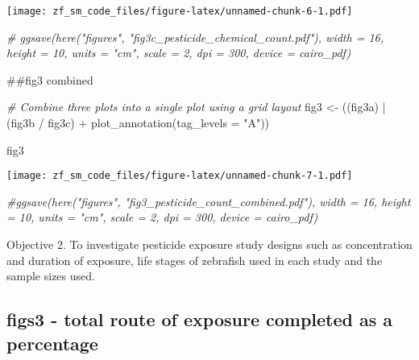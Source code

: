 \documentclass[
]{article}
\newenvironment{Shaded}{\begin{snugshade}}{\end{snugshade}}
\newcommand{\AttributeTok}[1]{\textcolor[rgb]{0.77,0.63,0.00}{#1}}
\newcommand{\CommentTok}[1]{\textcolor[rgb]{0.56,0.35,0.01}{\textit{#1}}}
\newcommand{\FunctionTok}[1]{\textcolor[rgb]{0.00,0.00,0.00}{#1}}
\newcommand{\NormalTok}[1]{#1}
\newcommand{\OtherTok}[1]{\textcolor[rgb]{0.56,0.35,0.01}{#1}}
\newcommand{\SpecialCharTok}[1]{\textcolor[rgb]{0.00,0.00,0.00}{#1}}
\newcommand{\StringTok}[1]{\textcolor[rgb]{0.31,0.60,0.02}{#1}}
\begin{document}
\texttt{[image: zf\_sm\_code\_files/figure-latex/unnamed-chunk-6-1.pdf]}

\begin{Shaded}
\begin{Highlighting}[]
\CommentTok{\# ggsave(here("figures", "fig3c\_pesticide\_chemical\_count.pdf"), width = 16, height = 10, units = "cm", scale = 2, dpi = 300, device = cairo\_pdf)}
\end{Highlighting}
\end{Shaded}

\#\#fig3 combined

\begin{Shaded}
\begin{Highlighting}[]
\CommentTok{\# Combine three plots into a single plot using a grid layout}
\NormalTok{fig3 }\OtherTok{\textless{}{-}}\NormalTok{ ((fig3a) }\SpecialCharTok{|}\NormalTok{ (fig3b }\SpecialCharTok{/}\NormalTok{ fig3c) }\SpecialCharTok{+} \FunctionTok{plot\_annotation}\NormalTok{(}\AttributeTok{tag\_levels =} \StringTok{"A"}\NormalTok{))}

\NormalTok{fig3}
\end{Highlighting}
\end{Shaded}

\texttt{[image: zf\_sm\_code\_files/figure-latex/unnamed-chunk-7-1.pdf]}

\begin{Shaded}
\begin{Highlighting}[]
\CommentTok{\#ggsave(here("figures", "fig3\_pesticide\_count\_combined.pdf"), width = 16, height = 10, units = "cm", scale = 2, dpi = 300, device = cairo\_pdf)}
\end{Highlighting}
\end{Shaded}

Objective 2. To investigate pesticide exposure study designs such as
concentration and duration of exposure, life stages of zebrafish used in
each study and the sample sizes used.

\hypertarget{figs3---total-route-of-exposure-completed-as-a-percentage}{%
\subsection{figs3 - total route of exposure completed as a
percentage}\label{figs3---total-route-of-exposure-completed-as-a-percentage}}
\end{document}
